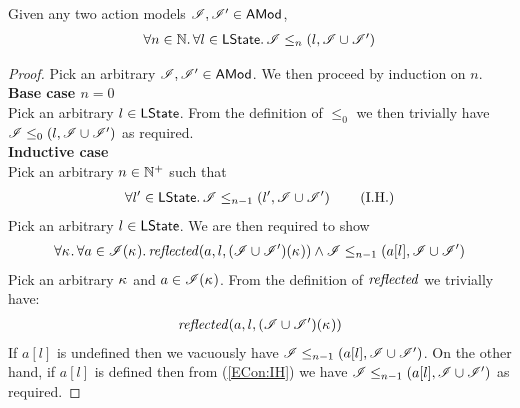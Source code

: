 \newpage	
%
\begin{lemma}\label{lem:extend-containment}
Given any two action models $\mathscr{I}, \mathscr{I}' \in \textsf{AMod}$, 
\[
\begin{array}{l l}
	\forall n \in \mathbb{N}.\, \forall l \in \textsf{LState}.\, \mathscr{I} \leq_{n}\left(l, \mathscr{I} \cup \mathscr{I}'\right)
\end{array}
\]
%
\begin{proof}
Pick an arbitrary $\mathscr{I}, \mathscr{I}' \in \textsf{AMod}$. We then proceed by induction on $n$.\\

\noindent\textbf{Base case $n = 0$}\\
Pick an arbitrary $l \in \textsf{LState}$. From the definition of $\leq_0$ we then trivially have $\mathscr{I} \leq_{0}\left(l, \mathscr{I} \cup \mathscr{I}'\right)$ as required.\\

\noindent\textbf{Inductive case}\\
Pick an arbitrary $n \in \mathbb{N}^{+}$ such that
%
\begin{align}
	\forall l' \in \textsf{LState}.\, \mathscr{I} \leq_{n-1}\left(l', \mathscr{I} \cup \mathscr{I}'\right) \label{ECon:IH} \tag{I.H.}
\end{align}
%
Pick an arbitrary $l \in \textsf{LState}$. We are then required to show 
%
\begin{align*}
	\forall \kappa_{}.\, \forall a \in \mathscr{I}(\kappa_{}).\, \mathit{reflected}(a, l, (\mathscr{I} \cup \mathscr{I}')(\kappa_{})) \land \mathscr{I} \leq_{n-1}\left(a[l], \mathscr{I} \cup \mathscr{I}'\right) 
\end{align*}
%
Pick an arbitrary $\kappa_{}$ and $a \in \mathscr{I}(\kappa_{})$. From the definition of $\mathit{reflected}$ we trivially have:
%
\begin{align*}
	\mathit{reflected}(a, l, (\mathscr{I} \cup \mathscr{I}')(\kappa_{}))
\end{align*}
%
If $a[l]$ is undefined then we vacuously have $\mathscr{I} \leq_{n-1}\left(a[l], \mathscr{I} \cup \mathscr{I}'\right)$. On the other hand, if $a[l]$ is defined then from (\ref{ECon:IH}) we have $\mathscr{I} \leq_{n-1}\left(a[l], \mathscr{I} \cup \mathscr{I}'\right)$ as required.
\end{proof}
%

\end{lemma}
%
